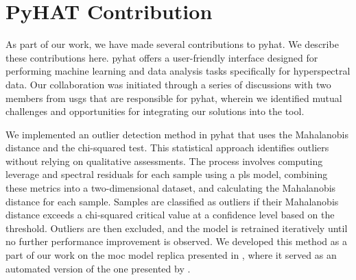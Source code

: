 \section{PyHAT Contribution}\label{sec:pyhat_contribution}
As part of our work, we have made several contributions to \gls{pyhat}. 
We describe these contributions here.
\gls{pyhat} offers a user-friendly interface designed for performing machine learning and data analysis tasks specifically for hyperspectral data.
Our collaboration was initiated through a series of discussions with two members from \gls{usgs} that are responsible for \gls{pyhat}, wherein we identified mutual challenges and opportunities for integrating our solutions into the tool.


We implemented an outlier detection method in \gls{pyhat} that uses the Mahalanobis distance and the chi-squared test. 
This statistical approach identifies outliers without relying on qualitative assessments. 
The process involves computing leverage and spectral residuals for each sample using a \gls{pls} model, combining these metrics into a two-dimensional dataset, and calculating the Mahalanobis distance for each sample. 
Samples are classified as outliers if their Mahalanobis distance exceeds a chi-squared critical value at a confidence level based on the threshold. 
Outliers are then excluded, and the model is retrained iteratively until no further performance improvement is observed.
We developed this method as a part of our work on the \gls{moc} model replica presented in \citet{p9_paper}, where it served as an automated version of the one presented by \citet{andersonImprovedAccuracyQuantitative2017}.

